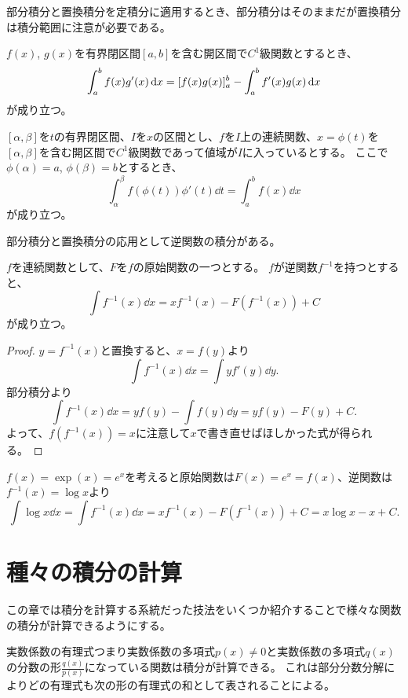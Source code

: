部分積分と置換積分を定積分に適用するとき、部分積分はそのままだが置換積分は積分範囲に注意が必要である。

\begin{theorem}[定積分の部分積分]
$f(x)$, $g(x)$を有界閉区間$[a, b]$を含む開区間で$C^1$級関数とするとき、
$$
\int_a^b f(x)g'(x)\dd{x} = [f(x)g(x)]_a^b-\int_a^b f'(x)g(x)\dd{x}
$$
が成り立つ。
\end{theorem}

\begin{theorem}[定積分の置換積分]
$[\alpha, \beta]$を$t$の有界閉区間、$I$を$x$の区間とし、$f$を$I$上の連続関数、$x = \phi(t)$を$[\alpha, \beta]$を含む開区間で$C^1$級関数であって値域が$I$に入っているとする。
ここで$\phi(\alpha) = a$, $\phi(\beta) = b$とするとき、
$$
\int_\alpha^\beta f(\phi(t))\phi'(t)\dd{t} = \int_a^b f(x)\dd{x}
$$
が成り立つ。
\end{theorem}

部分積分と置換積分の応用として逆関数の積分がある。

\begin{theorem}[逆関数の積分]
$f$を連続関数として、$F$を$f$の原始関数の一つとする。
$f$が逆関数$f^{-1}$を持つとすると、
$$
\int f^{-1}(x)\dd{x} = x f^{-1}(x)-F(f^{-1}(x))+C
$$
が成り立つ。
\end{theorem}

\begin{proof}
$y = f^{-1}(x)$と置換すると、$x = f(y)$より
$$
\int f^{-1}(x)\dd{x} = \int y f'(y)\dd{y}.
$$
部分積分より
$$
\int f^{-1}(x)\dd{x} = y f(y)-\int f(y)\dd{y} = y f(y)-F(y)+C.
$$
よって、$f(f^{-1}(x)) = x$に注意して$x$で書き直せばほしかった式が得られる。
\end{proof}

\begin{example}
$f(x) = \exp(x) = e^x$を考えると原始関数は$F(x) = e^x = f(x)$、逆関数は$f^{-1}(x) = \log x$より
$$
\int \log x\dd{x} = \int f^{-1}(x)\dd{x} = x f^{-1}(x)-F(f^{-1}(x))+C = x\log x-x+C.
$$
\end{example}

\section{種々の積分の計算}

この章では積分を計算する系統だった技法をいくつか紹介することで様々な関数の積分が計算できるようにする。

実数係数の有理式つまり実数係数の多項式$p(x) \ne 0$と実数係数の多項式$q(x)$の分数の形$\frac{q(x)}{p(x)}$になっている関数は積分が計算できる。
これは部分分数分解によりどの有理式も次の形の有理式の和として表されることによる。

